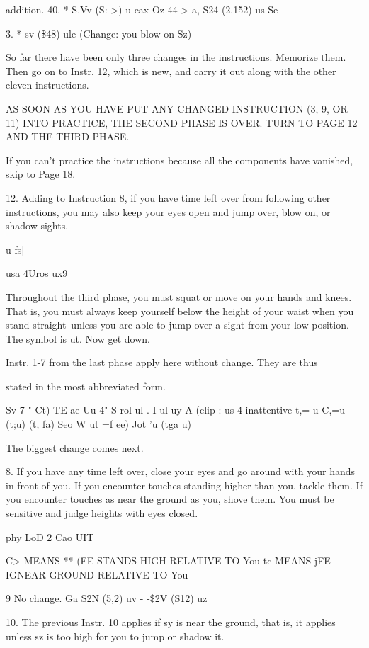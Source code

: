 \documentclass[10pt,twoside]{memoir}
\begin{document}
\begin{enumerate}
{\begin{enumerate}
\begin{sysrules}
\begin{sysrules}
\begin{sysrules}
\begin{sysrules}
{\begin{enumerate}
{{{{{{{addition. 
40. 
* S.Vv (S: >) u eax Oz 
44 > 
a, S24 (2.152) us Se 


3. 
* sv (\$48) ule 
(Change: you blow on Sz) 


So far there have been only three changes in the instructions. Memorize 
them. Then go on to Instr. 12, which is new, and carry it out along with the 
other eleven instructions. 


AS SOON AS YOU HAVE PUT ANY CHANGED INSTRUCTION (3, 
9, OR 11) INTO PRACTICE, THE SECOND PHASE IS OVER. TURN TO 
PAGE 12 AND THE THIRD PHASE. 


If you can't practice the instructions because all the components have 
vanished, skip to Page 18. 


12. Adding to Instruction 8, if you have time left over from following 
other instructions, you may also keep your eyes open and jump over, blow 
on, or shadow sights. 


u fs] 


usa 4Uros 
ux9 


Throughout the third phase, you must squat or move on your hands 
and knees. That is, you must always keep yourself below the height of your 
waist when you stand straight--unless you are able to jump over a sight from 
your low position. The symbol is ut. Now get down. 

Instr. 1-7 from the last phase apply here without change. They are thus 


stated in the most abbreviated form. 


Sv 7 
" Ct) TE ae 
Uu 4" S rol ul . I ul uy A 
(clip : us 4 inattentive 
t,= u C,=u 
(t;u) (t, fa) 
Seo W ut =f 
ee) 
Jot 'u 
(tga u) 


The biggest change comes next. 

8. If you have any time left over, close your eyes and go around with 
your hands in front of you. If you encounter touches standing higher than 
you, tackle them. If you encounter touches as near the ground as you, shove 
them. You must be sensitive and judge heights with eyes closed. 


phy LoD 
2 Cao UIT 


C> MEANS ** (FE STANDS HIGH RELATIVE TO You 
tc MEANS jFE IGNEAR GROUND RELATIVE TO You 


9 No change. 
Ga S2N (5,2) uv 
- -\$2V (S12) uz %


10. The previous Instr. 10 applies if sy is near the ground, that is, it 
applies unless sz is too high for you to jump or shadow it. 


}}}}}}}
\end{enumerate}}
\end{sysrules}
\end{sysrules}
\end{sysrules}
\end{sysrules}
\end{enumerate}}
\end{enumerate}
\end{document}
